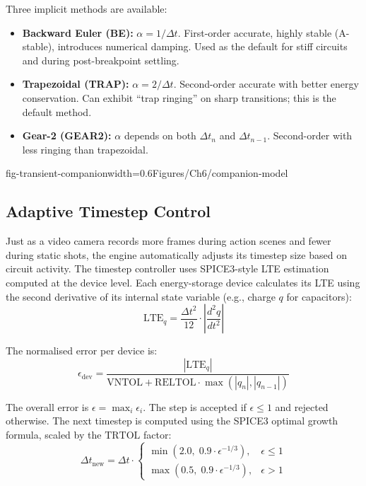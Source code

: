 Three implicit methods are available:
\begin{itemize}
  \item \textbf{Backward Euler (BE):} $\alpha = 1/\Delta t$. First-order accurate, highly stable (A-stable), introduces numerical damping. Used as the default for stiff circuits and during post-breakpoint settling.
  \item \textbf{Trapezoidal (TRAP):} $\alpha = 2/\Delta t$. Second-order accurate with better energy conservation. Can exhibit ``trap ringing'' on sharp transitions; this is the default method.
  \item \textbf{Gear-2 (GEAR2):} $\alpha$ depends on both $\Delta t_n$ and $\Delta t_{n-1}$. Second-order with less ringing than trapezoidal.
\end{itemize}

  {fig-transient-companion}{width=0.6\textwidth}{Figures/Ch6/companion-model}

\subsection{Adaptive Timestep Control}

Just as a video camera records more frames during action scenes and fewer during static shots, the engine automatically adjusts its timestep size based on circuit activity. The timestep controller uses SPICE3-style LTE estimation computed at the device level. Each energy-storage device calculates its LTE using the second derivative of its internal state variable (e.g., charge $q$ for capacitors):
\[
\text{LTE}_q = \frac{\Delta t^2}{12} \cdot \left|\frac{d^2q}{dt^2}\right|
\]

The normalised error per device is:
\[
\epsilon_{\text{dev}} = \frac{|\text{LTE}_q|}{\text{VNTOL} + \text{RELTOL} \cdot \max(|q_n|, |q_{n-1}|)}
\]

The overall error is $\epsilon = \max_i \epsilon_i$. The step is accepted if $\epsilon \leq 1$ and rejected otherwise. The next timestep is computed using the SPICE3 optimal growth formula, scaled by the $\text{TRTOL}$ factor:
\[
\Delta t_{\text{new}} = \Delta t \cdot
\begin{cases}
\min\left(2.0, \; 0.9 \cdot \epsilon^{-1/3}\right), & \epsilon \leq 1 \\[4pt]
\max\left(0.5, \; 0.9 \cdot \epsilon^{-1/3}\right), & \epsilon > 1
\end{cases}
\]

